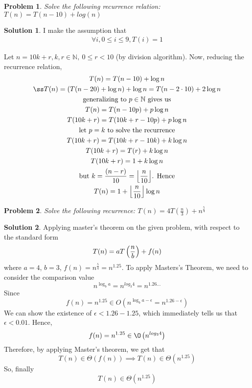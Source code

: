 \documentclass[12pt]{article}
\newtheorem*{problem}{Problem}
\theoremstyle{definition}
\newtheorem*{solution}{Solution}
\DeclarePairedDelimiter\floor{\lfloor}{\rfloor}
\begin{document}
\begin{problem}
Solve the following recurrence relation: $T(n) = T(n - 10) + log(n)$
\end{problem}
\begin{solution}
	I make the assumption that
	\begin{gather*}
		\forall i, 0 \leq i \leq 9, T(i) = 1
	\end{gather*}
	
	Let $n = 10k + r, k, r \in \mathbb N, \ 0 \leq r < 10$ (by division algorithm). Now, reducing the recurrence relation,
	\begin{gather*}
		T(n) = T(n - 10) + \log n \\ß
		T(n) = (T(n - 20) + \log n) + \log n = T(n - 2 \cdot 10) + 2 \log n \\
		\text{generalizing to $p \in \mathbb N$ gives us} \\
		T(n) = T(n - 10p) + p \log n  \\
		T(10k + r) = T(10k + r - 10p) + p \log n \\
		\text{let $p = k$ to solve the recurrence} \\
		T(10k + r) = T(10k + r -10k) + k \log n \\
		T(10k + r) = T(r) + k \log n \\
		T(10k + r) = 1 + k \log n \\
		\text{but $k = \frac{(n - r)}{10} = \floor*{\frac{n}{10}}$. Hence} \\
		T(n) = 1 + \floor*{\frac{n}{10}} \log n
	\end{gather*}
\end{solution}


\begin{problem}
Solve the following recurrence: $T(n) = 4T(\frac n 3) + n^{\frac 5 4}$
\end{problem}
\begin{solution}
	Applying master's theorem on the given problem, with respect to the standard form
	$$
	T(n) = aT \left( \frac{n}{b} \right) + f(n) \\
	$$
	where $a = 4$, $b = 3$, $f(n) = n^{\frac 5 4} = n^{1.25}$.
	To apply Masters's Theorem, we need to consider the comparison value
	$$n^{\log_b a} = n^{log_3 4} = n^{1.26...}$$
	Since
	$$
	f(n) = n^{1.25} \in O(n^{\log_b a - \epsilon} = n^{1.26 - \epsilon})
	$$
	We can show the existence of $\epsilon < 1.26 - 1.25$, which immediately tells us that $\epsilon < 0.01$. Hence,
	$$
	f(n) = n^{1.25} \in \O \left( n^{log_3 4} \right)
	$$
	Therefore, by applying Master's theorem, we get that 
	$$
	T(n) \in \Theta \left( f(n) \right) \implies T(n) \in \Theta \left( n^{1.25} \right)
	$$
	So, finally
	$$
	T(n) \in \Theta \left( n^{1.25} \right)
	$$
\end{solution}
\end{document}
